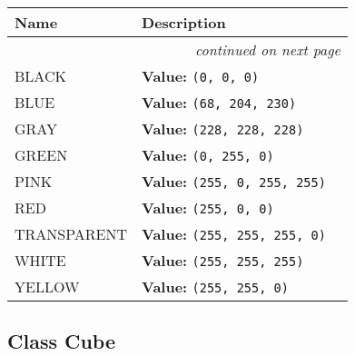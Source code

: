     \vspace{-1cm}
\hspace{\varindent}\begin{longtable}{|p{\varnamewidth}|p{\vardescrwidth}|l}
\cline{1-2}
\cline{1-2} \centering \textbf{Name} & \centering \textbf{Description}& \\
\cline{1-2}
\endhead\cline{1-2}\multicolumn{3}{r}{\small\textit{continued on next page}}\\\endfoot\cline{1-2}
\endlastfoot\raggedright B\-L\-A\-C\-K\- & \raggedright \textbf{Value:} 
{\tt \texttt{(}0\texttt{, }0\texttt{, }0\texttt{)}}&\\
\cline{1-2}
\raggedright B\-L\-U\-E\- & \raggedright \textbf{Value:} 
{\tt \texttt{(}68\texttt{, }204\texttt{, }230\texttt{)}}&\\
\cline{1-2}
\raggedright G\-R\-A\-Y\- & \raggedright \textbf{Value:} 
{\tt \texttt{(}228\texttt{, }228\texttt{, }228\texttt{)}}&\\
\cline{1-2}
\raggedright G\-R\-E\-E\-N\- & \raggedright \textbf{Value:} 
{\tt \texttt{(}0\texttt{, }255\texttt{, }0\texttt{)}}&\\
\cline{1-2}
\raggedright P\-I\-N\-K\- & \raggedright \textbf{Value:} 
{\tt \texttt{(}255\texttt{, }0\texttt{, }255\texttt{, }255\texttt{)}}&\\
\cline{1-2}
\raggedright R\-E\-D\- & \raggedright \textbf{Value:} 
{\tt \texttt{(}255\texttt{, }0\texttt{, }0\texttt{)}}&\\
\cline{1-2}
\raggedright T\-R\-A\-N\-S\-P\-A\-R\-E\-N\-T\- & \raggedright \textbf{Value:} 
{\tt \texttt{(}255\texttt{, }255\texttt{, }255\texttt{, }0\texttt{)}}&\\
\cline{1-2}
\raggedright W\-H\-I\-T\-E\- & \raggedright \textbf{Value:} 
{\tt \texttt{(}255\texttt{, }255\texttt{, }255\texttt{)}}&\\
\cline{1-2}
\raggedright Y\-E\-L\-L\-O\-W\- & \raggedright \textbf{Value:} 
{\tt \texttt{(}255\texttt{, }255\texttt{, }0\texttt{)}}&\\
\cline{1-2}
\end{longtable}



\subsection{Class Cube}

